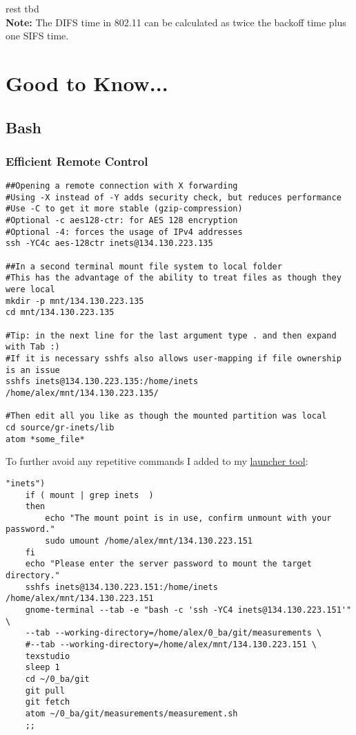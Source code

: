\documentclass{article}
\begin{document}
rest tbd \\

\textbf{Note:} The DIFS time in 802.11 can be calculated as twice the backoff time plus one SIFS time.



\section{Good to Know...}

\subsection{Bash}

\subsubsection{Efficient Remote Control}

\begin{verbatim}
##Opening a remote connection with X forwarding
#Using -X instead of -Y adds security check, but reduces performance
#Use -C to get it more stable (gzip-compression)
#Optional -c aes128-ctr: for AES 128 encryption
#Optional -4: forces the usage of IPv4 addresses
ssh -YC4c aes-128ctr inets@134.130.223.135

##In a second terminal mount file system to local folder
#This has the advantage of the ability to treat files as though they were local
mkdir -p mnt/134.130.223.135
cd mnt/134.130.223.135

#Tip: in the next line for the last argument type . and then expand with Tab :)
#If it is necessary sshfs also allows user-mapping if file ownership is an issue
sshfs inets@134.130.223.135:/home/inets /home/alex/mnt/134.130.223.135/

#Then edit all you like as though the mounted partition was local
cd source/gr-inets/lib
atom *some_file*

\end{verbatim}

To further avoid any repetitive commands I added to my \href{http://alexander-pastor.de/convenient-linux-game-launcher/}{launcher tool}:

\begin{verbatim}
"inets")
	if ( mount | grep inets  )
	then
		echo "The mount point is in use, confirm unmount with your password."
		sudo umount /home/alex/mnt/134.130.223.151
	fi
	echo "Please enter the server password to mount the target directory."
	sshfs inets@134.130.223.151:/home/inets /home/alex/mnt/134.130.223.151
	gnome-terminal --tab -e "bash -c 'ssh -YC4 inets@134.130.223.151'" \
	--tab --working-directory=/home/alex/0_ba/git/measurements \
	#--tab --working-directory=/home/alex/mnt/134.130.223.151 \
	texstudio
	sleep 1
	cd ~/0_ba/git
	git pull
	git fetch
	atom ~/0_ba/git/measurements/measurement.sh
	;;
\end{verbatim}
\end{document}
